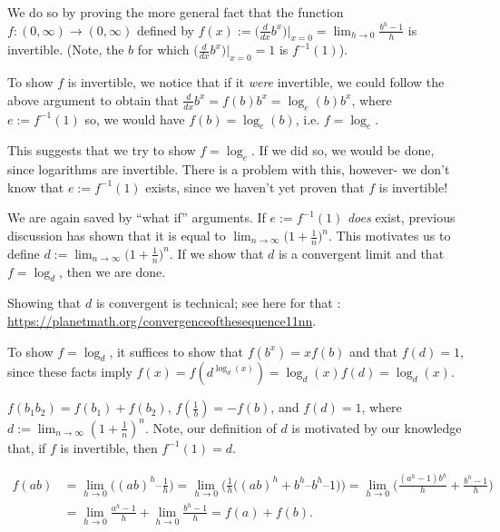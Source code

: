 We do so by proving the more general fact that the function ${f:(0, \infty) \rightarrow (0, \infty)}$ defined by $f(x) := \Big( \frac{d}{dx} b^x \Big)\Big|_{x = 0} = \lim_{h \rightarrow 0} \frac{b^h - 1}{h}$ is invertible. (Note, the $b$ for which $\Big( \frac{d}{dx} b^x \Big)\Big|_{x = 0} = 1$ is $f^{-1}(1)$).
        
            To show $f$ is invertible, we notice that if it \textit{were} invertible, we could follow the above argument to obtain that $\frac{d}{dx} b^x = f(b) b^x = \log_e(b) b^x$, where $e := f^{-1}(1)$ so, we would have $f(b) = \log_e(b)$, i.e. $f = \log_e$.
            
            This suggests that we try to show $f = \log_e$. If we did so, we would be done, since logarithms are invertible. There is a problem with this, however- we don't know that $e := f^{-1}(1)$ exists, since we haven't yet proven that $f$ is invertible!
            
            We are again saved by ``what if'' arguments. If $e := f^{-1}(1)$ \textit{does} exist, previous discussion has shown that it is equal to $\lim_{n \rightarrow \infty} \Big(1 + \frac{1}{n}\Big)^n$. This motivates us to define $d := \lim_{n \rightarrow \infty} \Big(1 + \frac{1}{n}\Big)^n$. If we show that $d$ is a convergent limit and that $f = \log_d$, then we are done.
    
            Showing that $d$ is convergent is technical; see here for that : \url{https://planetmath.org/convergenceofthesequence11nn}.
            
            To show $f = \log_d$, it suffices to show that $f(b^x) = xf(b)$ and that $f(d) = 1$, since these facts imply $f(x) = f(d^{\log_{d}(x)}) = \log_{d}(x) f(d) = \log_{d}(x)$.
            
            \vspace{.5cm}
            
            $f(b_1 b_2) = f(b_1) + f(b_2)$, $f(\frac{1}{b}) = -f(b)$, and $f(d) = 1$, where $d := \lim_{n \rightarrow \infty} (1 + \frac{1}{n})^n$. Note, our definition of $d$ is motivated by our knowledge that, if $f$ is invertible, then $f^{-1}(1) = d$.
            
            \begin{align*}
                    f(ab) &= \lim_{h \rightarrow 0} \Big( (ab)^h – \frac{1}{h} \Big) 
                    = \lim_{h \rightarrow 0} \Big( \frac{1}{h} \Big( (ab)^h + b^h – b^h – 1\Big) \Big)
                    = \lim_{h \rightarrow 0} \Big( \frac{(a^h - 1)b^h}{h} + \frac{b^h - 1}{h} \Big) \\
                    &= \lim_{h \rightarrow 0} \frac{a^h - 1}{h} + \lim_{h \rightarrow 0} \frac{b^h - 1}{h}
                    = f(a) + f(b).
            \end{align*}
                
